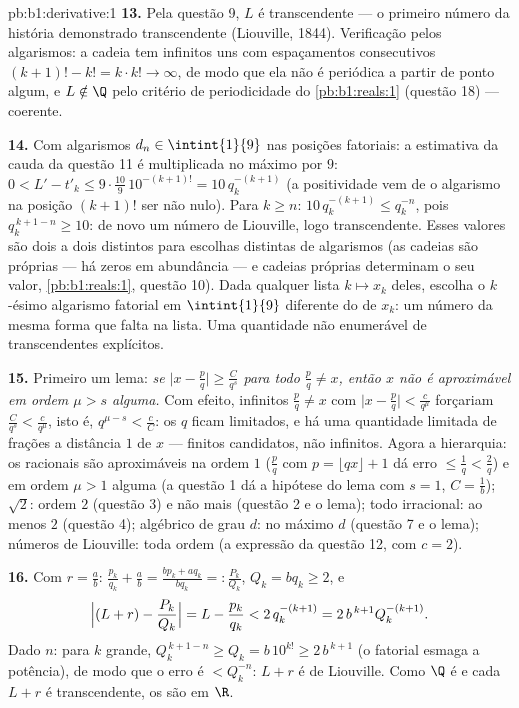 \begin{solution}{pb:b1:derivative:1}
\textbf{13.} Pela questão 9, $L$ é transcendente --- o primeiro
número da história demonstrado transcendente (Liouville, 1844).
Verificação pelos algarismos: a cadeia tem infinitos uns com
espaçamentos consecutivos $(k+1)! - k! = k\cdot k! \to \infty$, de modo que ela não
é periódica a partir de ponto algum, e $L \notin \Q$ pelo critério
de periodicidade do \cref{pb:b1:reals:1} (questão 18) --- coerente.

\textbf{14.} Com algarismos $d_n \in \intint{1}{9}$ nas
posições fatoriais: a estimativa da cauda da questão 11 é multiplicada
no máximo por $9$: $0 < L' - t'_k \leq 9\cdot\frac{10}{9}\,10^{-(k+1)!} =
10\,q_k^{-(k+1)}$ (a positividade vem de o algarismo na posição
$(k+1)!$ ser não nulo). Para $k \geq n$: $10\,q_k^{-(k+1)} \leq
q_k^{-n}$, pois $q_k^{\,k+1-n} \geq 10$: de novo um número de Liouville,
logo transcendente. Esses valores são dois a dois
distintos para escolhas distintas de algarismos (as cadeias são próprias
--- há zeros em abundância --- e cadeias próprias determinam o seu valor,
\cref{pb:b1:reals:1}, questão 10). Dada qualquer lista $k \mapsto
x_k$
deles, escolha o $k$-ésimo algarismo fatorial em
$\intint{1}{9}$ diferente do de $x_k$: um número da
mesma forma que falta na lista. Uma quantidade não enumerável de
transcendentes explícitos.

\textbf{15.} Primeiro um lema: \emph{se $\bigl|x - \frac pq\bigr|
\geq \frac{C}{q^s}$ para todo $\frac pq \neq x$, então $x$ não é
aproximável em ordem $\mu > s$ alguma.} Com efeito, infinitos
$\frac pq \neq x$ com $\bigl|x - \frac pq\bigr| <
\frac{c}{q^\mu}$ forçariam $\frac{C}{q^s} < \frac{c}{q^\mu}$,
isto é, $q^{\mu - s} < \frac cC$: os $q$ ficam limitados, e há
uma quantidade limitada de frações a distância $1$ de $x$ ---
finitos candidatos, não infinitos. Agora a
hierarquia: os racionais são aproximáveis na ordem $1$ ($\frac
pq$ com $p = \lfloor qx\rfloor + 1$ dá erro $\leq \frac1q <
\frac2q$) e em ordem $\mu > 1$ alguma (a questão 1 dá a
hipótese do lema com $s = 1$, $C = \frac1b$); $\sqrt2$:
ordem $2$ (questão 3) e não mais (questão 2 e o lema);
todo irracional: ao menos $2$ (questão 4); algébrico de grau
$d$: no máximo $d$ (questão 7 e o lema); números de Liouville:
toda ordem (a expressão da questão 12, com $c = 2$).

\textbf{16.} Com $r = \frac ab$: $\frac{p_k}{q_k} + \frac ab =
\frac{b p_k + a q_k}{b q_k} =: \frac{P_k}{Q_k}$, $Q_k = b q_k
\geq 2$, e
\[
\Bigl|(L + r) - \frac{P_k}{Q_k}\Bigr| = L - \frac{p_k}{q_k}
< 2\,q_k^{-(k+1)} = 2\,b^{\,k+1} Q_k^{-(k+1)} .
\]
Dado $n$: para $k$ grande, $Q_k^{\,k+1-n} \geq Q_k = b\,10^{k!}
\geq 2\,b^{\,k+1}$ (o fatorial esmaga a potência), de modo que o
erro é $< Q_k^{-n}$: $L + r$ é de Liouville. Como $\Q$ é 
e cada $L + r$ é transcendente, os  são
 em $\R$.


\end{solution}
